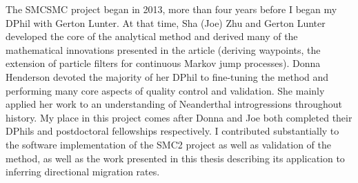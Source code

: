 The SMCSMC project began in 2013, more than four years before I began my DPhil with Gerton Lunter. At that time, Sha (Joe) Zhu and Gerton Lunter developed the core of the analytical method and derived many of the mathematical innovations presented in the article (deriving waypoints, the extension of particle filters for continuous Markov jump processes). Donna Henderson devoted the majority of her DPhil to fine-tuning the method and performing many core aspects of quality control and validation. She mainly applied her work to an understanding of Neanderthal introgressions throughout history. My place in this project comes after Donna and Joe both completed their DPhils and postdoctoral fellowships respectively. I contributed substantially to the software implementation of the SMC2 project as well as validation of the method, as well as the work presented in this thesis describing its application to inferring directional migration rates.